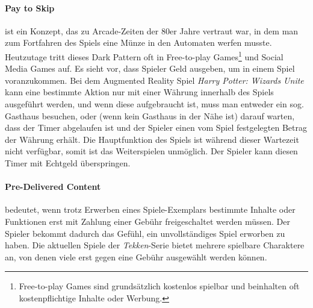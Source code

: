 \documentclass[a4paper]{article}
\begin{document}
\paragraph{Pay to Skip} ist ein Konzept, das zu Arcade-Zeiten der 80er Jahre vertraut war, in dem man zum Fortfahren des Spiels eine Münze in den Automaten werfen musste. Heutzutage tritt dieses Dark Pattern oft in Free-to-play Games\footnote{\label{foot:10} Free-to-play Games sind grundsätzlich kostenlos spielbar und beinhalten oft kostenpflichtige Inhalte oder Werbung.} und Social Media Games auf. Es sieht vor, dass Spieler Geld ausgeben, um in einem Spiel voranzukommen.\newline
Bei dem Augmented Reality Spiel \textit{Harry Potter: Wizards Unite} kann eine bestimmte Aktion nur mit einer Währung innerhalb des Spiels ausgeführt werden, und wenn diese aufgebraucht ist, muss man entweder ein sog. Gasthaus besuchen, oder (wenn kein Gasthaus in der Nähe ist) darauf warten, dass der Timer abgelaufen ist und der Spieler einen vom Spiel festgelegten Betrag der Währung erhält. Die Hauptfunktion des Spiels ist während dieser Wartezeit nicht verfügbar, somit ist das Weiterspielen unmöglich. Der Spieler kann diesen Timer mit Echtgeld überspringen.

\paragraph{Pre-Delivered Content} bedeutet, wenn trotz Erwerben eines Spiele-Exemplars bestimmte Inhalte oder Funktionen erst mit Zahlung einer Gebühr freigeschaltet werden müssen. Der Spieler bekommt dadurch das Gefühl, ein unvollständiges Spiel erworben zu haben.\newline
Die aktuellen Spiele der \textit{Tekken}-Serie bietet mehrere spielbare Charaktere an, von denen viele erst gegen eine Gebühr ausgewählt werden können. 
\end{document}
